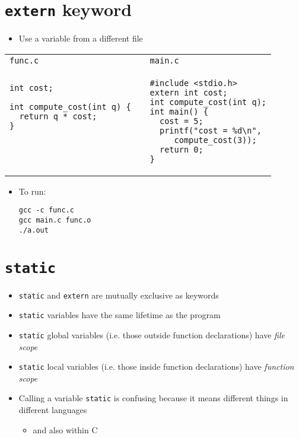 \documentclass{article}
\begin{document}
\section{\texttt{extern} keyword}
\begin{itemize}
\item Use a variable from a different file
\end{itemize}
\begin{tabular}{lll}
\texttt{func.c} &  & \texttt{main.c}\\
\begin{boxedminipage}{5.3cm}
\begin{verbatim}
int cost;

int compute_cost(int q) {
  return q * cost;
}




\end{verbatim}
\end{boxedminipage}
&&
\begin{boxedminipage}{5cm}
\begin{verbatim}
#include <stdio.h>
extern int cost;
int compute_cost(int q);
int main() {
  cost = 5;
  printf("cost = %d\n",
     compute_cost(3));
  return 0;
}
\end{verbatim}
\end{boxedminipage}
\end{tabular}

\begin{itemize}
\item To run:
\begin{verbatim}
gcc -c func.c
gcc main.c func.o
./a.out
\end{verbatim}
\end{itemize}



\section{\texttt{static}}
\begin{itemize}
\item \verb!static! and \verb!extern! are mutually exclusive as keywords
\item \verb!static! variables have the same lifetime as the program
\item \verb!static! global variables (i.e. those outside function declarations)
 have \emph{file scope}
\item \verb!static! local variables (i.e. those inside function declarations) have \emph{function scope}
\item Calling a variable \verb!static! is confusing because it means different things in different languages
\begin{itemize}
\item and also within C
\end{itemize}
\end{itemize}
\end{document}
